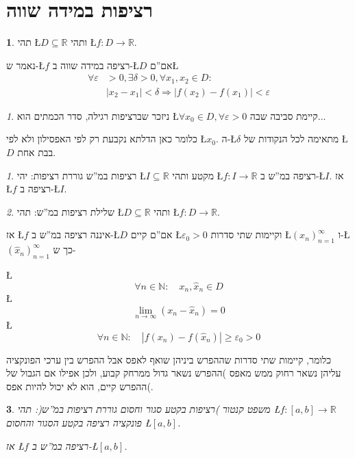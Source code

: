\documentclass[english,hebrew]{article}
\theoremstyle{remark}
\newtheorem*{rem*}{\protect\remarkname}
\theoremstyle{definition}
\newtheorem*{defn*}{\protect\definitionname}
\theoremstyle{plain}
\newtheorem{thm}{\protect\theoremname}
\theoremstyle{remark}
\newtheorem{claim}[thm]{\protect\claimname}
\theoremstyle{plain}
\theoremstyle{plain}
\theoremstyle{definition}
\theoremstyle{plain}
\providecommand{\claimname}{טענה}
\providecommand{\definitionname}{הגדרה}
\providecommand{\remarkname}{הערה}
\providecommand{\theoremname}{משפט}
\begin{document}
\part{רציפות במידה שווה}
\begin{defn*}
תהי \L{$D\subseteq\mathbb{R}$} ותהי \L{$f:D\rightarrow\mathbb{R}$}.

נאמר ש-\L{$f$} רציפה במידה שווה ב-\L{$D$} אם\textquotedblright ם\L{%
\begin{align*}
\forall\varepsilon & >0,\exists\delta>0,\forall x_{1},x_{2}\in D:\\
 & \left|x_{2}-x_{1}\right|<\delta\Rightarrow\left|f\left(x_{2}\right)-f\left(x_{1}\right)\right|<\varepsilon
\end{align*}
}%
\end{defn*}
\begin{rem*}
ניזכר שברציפות רגילה, סדר הכמתים הוא \L{$\forall x_{0}\in D,\forall\varepsilon>0$}
קיימת סביבה שבה...

כלומר כאן הדלתא נקבעת רק לפי האפסילון ולא לפי \L{$x_{0}$}. ה-\L{$\delta$}
מתאימה לכל הנקודות של \L{$D$} בבת אחת.
\end{rem*}
\begin{claim}
רציפות במ\textquotedblright ש גוררת רציפות: יהי \L{$I\subseteq\mathbb{R}$}
מקטע ותהי \L{$f:I\rightarrow\mathbb{R}$} רציפה במ\textquotedblright ש
ב-\L{$I$}. אז \L{$f$} רציפה ב-\L{$I$}.
\end{claim}

\begin{claim}
שלילת רציפות במ\textquotedblright ש: תהי \L{$D\subseteq\mathbb{R}$}
ותהי \L{$f:D\rightarrow\mathbb{R}$}.

אז \L{$f$} איננה רציפה במ\textquotedblright ש ב-\L{$D$} אם\textquotedblright ם
קיים \L{$\varepsilon_{0}>0$} וקיימות שתי סדרות \L{$\left(x_{n}\right)_{n=1}^{\infty}$}
ו-\L{$\left(\hat{x}_{n}\right)_{n=1}^{\infty}$} כך ש-

\L{%
\[
\forall n\in\mathbb{N}:\quad x_{n},\hat{x}_{n}\in D
\]
}%
\L{%
\[
\underset{n\rightarrow\infty}{\lim}\left(x_{n}-\hat{x}_{n}\right)=0
\]
}%
\L{%
\[
\forall n\in\mathbb{N}:\quad\left|f\left(x_{n}\right)-f\left(\hat{x}_{n}\right)\right|\ge\varepsilon_{0}>0
\]
}%

כלומר, קיימות שתי סדרות שההפרש ביניהן שואף לאפס אבל ההפרש בין ערכי
הפונקציה עליהן נשאר רחוק ממש מאפס )ההפרש נשאר גדול ממרחק קבוע, ולכן
אפילו אם הגבול של ההפרש קיים, הוא לא יכול להיות אפס(. 
\end{claim}

\begin{thm}
משפט קנטור )רציפות בקטע סגור וחסום גוררת רציפות במ\textquotedblright ש(:
תהי \L{$f:\left[a,b\right]\rightarrow\mathbb{R}$} פונקציה רציפה בקטע
הסגור והחסום \L{$\left[a,b\right]$}. 

אז \L{$f$} רציפה במ\textquotedblright ש ב-\L{$\left[a,b\right]$}.
\end{thm}
\end{document}
